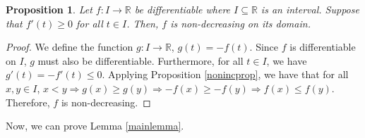 \documentclass{article}
\renewcommand{\implies}{\Rightarrow}
\newcommand{\R}{\mathbb{R}}
\theoremstyle{plain} %
\numberwithin{thm}{section} %
\newtheorem{prop}[thm]{Proposition}
\theoremstyle{definition} %
\begin{document}
\begin{prop}
    \label{nondecprop}
    Let $f: I \to \R$ be differentiable where $I \subseteq \R$ is an interval. Suppose that $f'(t) \geq 0$ for all $t \in I$. Then, $f$ is non-decreasing on its domain.
\end{prop}

\begin{proof}
We define the function $g: I \to \R$, $g(t) = -f(t)$. Since $f$ is differentiable on $I$, $g$ must also be differentiable. Furthermore, for all $t \in I$, we have $g'(t) = -f'(t) \leq 0$. Applying Proposition \ref{nonincprop}, we have that for all $x, y \in I$, $x < y \implies g(x) \geq g(y) \implies -f(x) \geq -f(y) \implies f(x) \leq f(y)$. Therefore, $f$ is non-decreasing.

\end{proof}

Now, we can prove Lemma \ref{mainlemma}.
\end{document}

